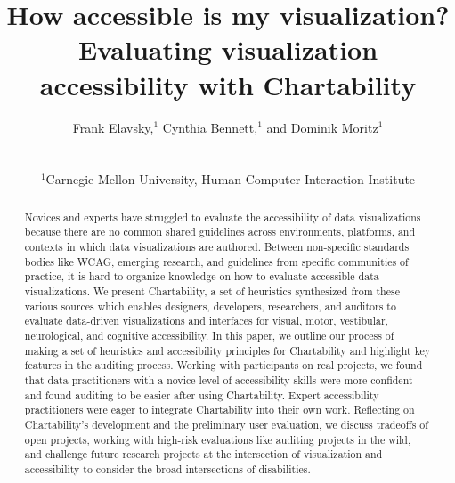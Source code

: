 \documentclass{egpubl}
\title[Chartability]%
      {How accessible is my visualization? Evaluating visualization accessibility with Chartability}
\author[F. Elavsky, C. Bennett, \& D. Moritz]
{\parbox{\textwidth}{\centering Frank Elavsky,$^{1}$\orcid{0000-0002-6849-5893}
        Cynthia Bennett,$^{1}$
        and Dominik Moritz$^{1}$\orcid{0000-0002-3110-1053}
        }
        \\
{\parbox{\textwidth}{\centering $^1$Carnegie Mellon University, Human-Computer Interaction Institute\\
       } 
}
}
\begin{document}
\def\arraystretch{1.3}


\maketitle
\begin{abstract}
Novices and experts have struggled to evaluate the accessibility of data visualizations because there are no common shared guidelines across environments, platforms, and contexts in which data visualizations are authored. Between non-specific standards bodies like WCAG, emerging research, and guidelines from specific communities of practice, it is hard to organize knowledge on how to evaluate accessible data visualizations. We present Chartability, a set of heuristics synthesized from these various sources which enables designers, developers, researchers, and auditors to evaluate data-driven visualizations and interfaces for visual, motor, vestibular, neurological, and cognitive accessibility. In this paper, we outline our process of making a set of heuristics and accessibility principles for Chartability and highlight key features in the auditing process. Working with participants on real projects, we found that data practitioners with a novice level of accessibility skills were more confident and found auditing to be easier after using Chartability. Expert accessibility practitioners were eager to integrate Chartability into their own work. Reflecting on Chartability’s development and the preliminary user evaluation, we discuss tradeoffs of open projects, working with high-risk evaluations like auditing projects in the wild, and challenge future research projects at the intersection of visualization and accessibility to consider the broad intersections of disabilities.


\end{abstract}
\end{document}
